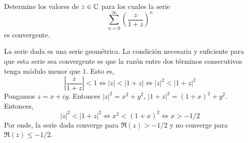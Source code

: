 \begin{exercise}
Determine los valores de $z \in \mathbb C$ para los cuales la serie
$$\sum_{n=0}^\infty \left( \frac z {1+z} \right)^n$$
es convergente.
\end{exercise}

\begin{solution}
La serie dada es una serie geométrica. La condición necesaria y suficiente para que esta serie sea convergente es que la razón entre dos términos consecutivos tenga módulo menor que $1$. Esto es,
$$\left| \frac z {1+z} \right| < 1 \iff |z| < |1+z| \iff |z|^2 < |1+z|^2$$
Pongamos $z = x + iy$. Entonces $|z|^2 = x^2 + y^2$, $|1+z|^2 = (1+x)^2 + y^2$. Entonces,
$$|z|^2 < |1+z|^2 \iff x^2 < (1+x)^2 \iff x > -1/2$$
Por ende, la serie dada converge para $\Re(z) > -1/2$ y no converge para $\Re(z) \le -1/2$.
\end{solution}

